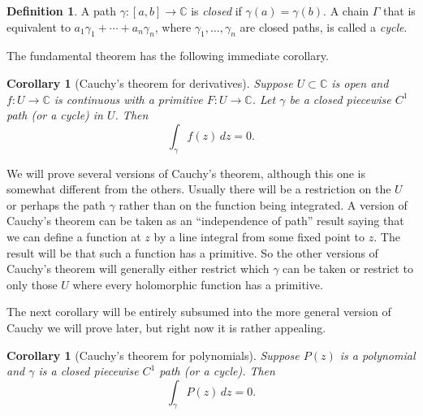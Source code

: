 \documentclass[12pt,openany]{book}
\newcommand{\C}{{\mathbb{C}}}
\newcommand{\myindex}[1]{#1\index{#1}}
\theoremstyle{plain}
\newtheorem{cor}[thm]{Corollary}
\theoremstyle{remark}
\theoremstyle{definition}
\newtheorem{defn}[thm]{Definition}
\theoremstyle{exercise}
\theoremstyle{example}
\begin{document}
\begin{defn}
A path $\gamma \colon [a,b] \to \C$ is \emph{closed} if 
$\gamma(a) = \gamma(b)$.
A chain $\Gamma$ that is equivalent to
$a_1 \gamma_1 + \cdots + a_n \gamma_n$, where $\gamma_1, \ldots, \gamma_n$
are closed paths,
is called a \emph{\myindex{cycle}}.
\end{defn}

The fundamental theorem has the following
immediate corollary.

\begin{cor}[Cauchy's theorem for derivatives] \label{cor:cauchyforders}
Suppose $U \subset \C$ is open and $f \colon U \to \C$
is continuous with a primitive
$F \colon U \to \C$.
Let $\gamma$ be a closed piecewise $C^1$ path (or a cycle) in $U$.
Then
\begin{equation*}
\int_\gamma f(z) \, dz = 0 .
\end{equation*}
\end{cor}

We will prove several versions of Cauchy's theorem, although this one is
somewhat different from the others.  Usually there will be a restriction on
the $U$ or perhaps the path $\gamma$ rather
than on the function being integrated.
A version of Cauchy's theorem can be taken as an ``independence of path''
result saying that we can define a function at $z$ by a line integral
from some fixed point to $z$.  The result will be that such a function has a
primitive.  So the other versions of Cauchy's theorem will generally
either restrict which $\gamma$ can be taken or
restrict to only those $U$ where every holomorphic function has a primitive.

The next corollary will be entirely
subsumed into the more general version of Cauchy we will prove later,
but right now it is rather appealing.

\begin{cor}[Cauchy's theorem for polynomials]
Suppose $P(z)$ is a polynomial and $\gamma$ is a closed
piecewise $C^1$ path (or a cycle).  Then
\begin{equation*}
\int_\gamma P(z) \, dz = 0 .
\end{equation*}
\end{cor}
\end{document}
